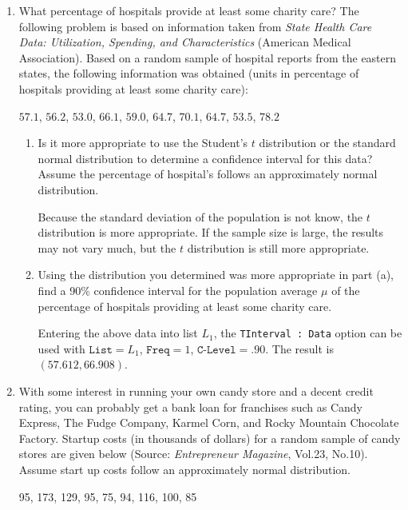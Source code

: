 \begin{enumerate}
\item What percentage of hospitals provide at least some charity care?  The following problem is based on information taken from {\em State Health Care Data: Utilization, Spending, and Characteristics} (American Medical Association).  Based on a random sample of hospital reports from the eastern states, the following information was obtained (units in percentage of hospitals providing at least some charity care):
\begin{center}
$57.1$, $56.2$, $53.0$, $66.1$, $59.0$, $64.7$, $70.1$, $64.7$, $53.5$, $78.2$
\end{center}
	\begin{enumerate}
	\item Is it more appropriate to use the Student's $t$ distribution or the standard normal distribution to determine a confidence interval for this data? Assume the percentage of hospital's follows an approximately normal distribution.
	
	{\answer  Because the standard deviation of the population is not know, the $t$ distribution is more appropriate.  If the sample size is large, the results may not vary much, but the $t$ distribution is still more appropriate.
	} 
	
	\item Using the distribution you determined was more appropriate in part (a), find a 90\% confidence interval for the population average $\mu$ of the percentage of hospitals providing at least some charity care. 
	
	{\answer Entering the above data into list $L_1$, the \texttt{TInterval : Data} option can be used with
	$\texttt{List} = L_1$, $\texttt{Freq} = 1$, $\texttt{C-Level} = .90$.  The result is $(57.612, 66.908)$.
	} 
	\end{enumerate}

\newpage

\item With some interest in running your own candy store and a decent credit rating, you can probably get a bank loan for franchises such as Candy Express, The Fudge Company, Karmel Corn, and Rocky Mountain Chocolate Factory.  Startup costs (in thousands of dollars) for a random sample of candy stores are given below (Source: {\em Entrepreneur Magazine}, Vol.23, No.10). Assume start up costs follow an approximately normal distribution.

\begin{center}
95, 173, 129, 95, 75, 94, 116, 100, 85
\end{center}


\end{enumerate}
